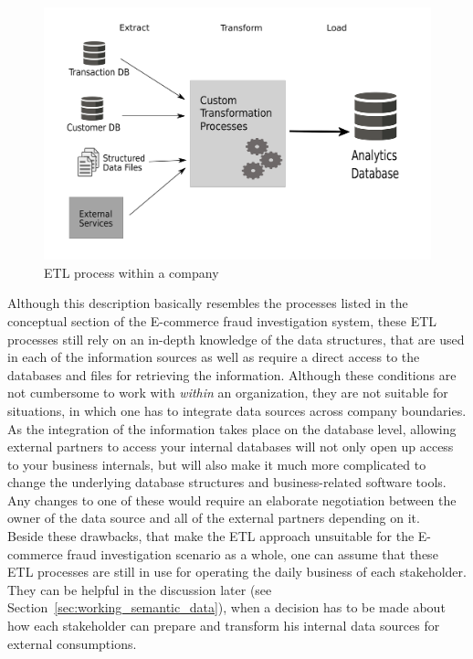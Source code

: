 \begin{figure}[!ht]
  \centering
  \includegraphics[width=0.9\columnwidth]{images/etl_process.pdf}
  \caption[ETL process within a company]{\gls{ETL} process within a company \citep[pg. 165]{wood2014linked}}
\label{fig:images_etl_process}
\end{figure}

Although this description basically resembles the processes listed in the conceptual section of the \gls{E-commerce} fraud investigation system, these \gls{ETL} processes still rely on an in-depth knowledge of the data structures, that are used in each of the information sources as well as require a direct access to the databases and files for retrieving the information. Although these conditions are not cumbersome to work with \emph{within} an organization, they are not suitable for situations, in which one has to integrate data sources across company boundaries. As the integration of the information takes place on the database level, allowing external partners to access your internal databases will not only open up access to your business internals, but will also make it much more complicated to change the underlying database structures and business-related software tools. Any changes to one of these would require an elaborate negotiation between the owner of the data source and all of the external partners depending on it. \\

Beside these drawbacks, that make the \gls{ETL} approach unsuitable for the \gls{E-commerce} fraud investigation scenario as a whole, one can assume that these \gls{ETL} processes are still in use for operating the daily business of each stakeholder. They can be helpful in the discussion later (see Section~\ref{sec:working_semantic_data}), when a decision has to be made about how each stakeholder can prepare and transform his internal data sources for external consumptions.


